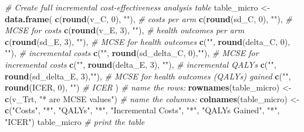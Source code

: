 \documentclass[
]{article}
\newenvironment{Shaded}{\begin{snugshade}}{\end{snugshade}}
\newcommand{\CommentTok}[1]{\textcolor[rgb]{0.56,0.35,0.01}{\textit{#1}}}
\newcommand{\DecValTok}[1]{\textcolor[rgb]{0.00,0.00,0.81}{#1}}
\newcommand{\FunctionTok}[1]{\textcolor[rgb]{0.13,0.29,0.53}{\textbf{#1}}}
\newcommand{\NormalTok}[1]{#1}
\newcommand{\OtherTok}[1]{\textcolor[rgb]{0.56,0.35,0.01}{#1}}
\newcommand{\StringTok}[1]{\textcolor[rgb]{0.31,0.60,0.02}{#1}}
\begin{document}
\begin{Shaded}
\begin{Highlighting}[]
\CommentTok{\# Create full incremental cost{-}effectiveness analysis table}
\NormalTok{table\_micro }\OtherTok{\textless{}{-}} \FunctionTok{data.frame}\NormalTok{(}
  \FunctionTok{c}\NormalTok{(}\FunctionTok{round}\NormalTok{(v\_C, }\DecValTok{0}\NormalTok{),  }\StringTok{""}\NormalTok{),           }\CommentTok{\# costs per arm}
  \FunctionTok{c}\NormalTok{(}\FunctionTok{round}\NormalTok{(sd\_C, }\DecValTok{0}\NormalTok{), }\StringTok{""}\NormalTok{),           }\CommentTok{\# MCSE for costs}
  \FunctionTok{c}\NormalTok{(}\FunctionTok{round}\NormalTok{(v\_E, }\DecValTok{3}\NormalTok{),  }\StringTok{""}\NormalTok{),           }\CommentTok{\# health outcomes per arm}
  \FunctionTok{c}\NormalTok{(}\FunctionTok{round}\NormalTok{(sd\_E, }\DecValTok{3}\NormalTok{), }\StringTok{""}\NormalTok{),           }\CommentTok{\# MCSE for health outcomes}
  \FunctionTok{c}\NormalTok{(}\StringTok{""}\NormalTok{, }\FunctionTok{round}\NormalTok{(delta\_C, }\DecValTok{0}\NormalTok{),   }\StringTok{""}\NormalTok{),  }\CommentTok{\# incremental costs}
  \FunctionTok{c}\NormalTok{(}\StringTok{""}\NormalTok{, }\FunctionTok{round}\NormalTok{(sd\_delta\_C, }\DecValTok{0}\NormalTok{),}\StringTok{""}\NormalTok{),  }\CommentTok{\# MCSE for incremental costs}
  \FunctionTok{c}\NormalTok{(}\StringTok{""}\NormalTok{, }\FunctionTok{round}\NormalTok{(delta\_E, }\DecValTok{3}\NormalTok{),   }\StringTok{""}\NormalTok{),  }\CommentTok{\# incremental QALYs }
  \FunctionTok{c}\NormalTok{(}\StringTok{""}\NormalTok{, }\FunctionTok{round}\NormalTok{(sd\_delta\_E, }\DecValTok{3}\NormalTok{),}\StringTok{""}\NormalTok{),  }\CommentTok{\# MCSE for health outcomes (QALYs) gained}
  \FunctionTok{c}\NormalTok{(}\StringTok{""}\NormalTok{, }\FunctionTok{round}\NormalTok{(ICER, }\DecValTok{0}\NormalTok{),      }\StringTok{""}\NormalTok{)   }\CommentTok{\# ICER}
\NormalTok{)}
\CommentTok{\# name the rows:}
\FunctionTok{rownames}\NormalTok{(table\_micro) }\OtherTok{\textless{}{-}} \FunctionTok{c}\NormalTok{(v\_Trt, }\StringTok{"* are MCSE values"}\NormalTok{)  }
\CommentTok{\# name the columns:}
\FunctionTok{colnames}\NormalTok{(table\_micro) }\OtherTok{\textless{}{-}}  
  \FunctionTok{c}\NormalTok{(}\StringTok{"Costs"}\NormalTok{, }\StringTok{"*"}\NormalTok{,  }\StringTok{"QALYs"}\NormalTok{, }\StringTok{"*"}\NormalTok{, }\StringTok{"Incremental Costs"}\NormalTok{,}
    \StringTok{"*"}\NormalTok{, }\StringTok{"QALYs Gained"}\NormalTok{, }\StringTok{"*"}\NormalTok{, }\StringTok{"ICER"}\NormalTok{)}
\NormalTok{table\_micro  }\CommentTok{\# print the table }
\end{Highlighting}
\end{Shaded}
\end{document}
